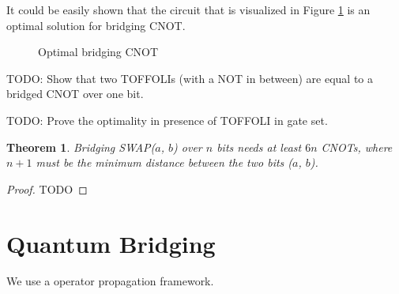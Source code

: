 \documentclass{report}
\newtheorem{theorem}{Theorem}
\begin{document}
It could be easily shown that the circuit that is visualized in Figure \ref{fig:optimal-bridging-cnot} is an optimal solution for bridging CNOT.

\begin{figure}[ht]
  \centering
  \caption{Optimal bridging CNOT}
  \label{fig:optimal-bridging-cnot}
\end{figure}

TODO: Show that two TOFFOLIs (with a NOT in between) are equal to a bridged CNOT over one bit.

TODO: Prove the optimality in presence of TOFFOLI in gate set.

\begin{theorem}
  Bridging SWAP($a$, $b$) over $n$ bits needs at least $6n$ CNOTs, where $n + 1$ must be the minimum distance between the two bits ($a$, $b$).
  \label{thm:bridging-swap}
\end{theorem}
\begin{proof}
  TODO
\end{proof}

\section{Quantum Bridging}

We use a operator propagation framework.
\end{document}
